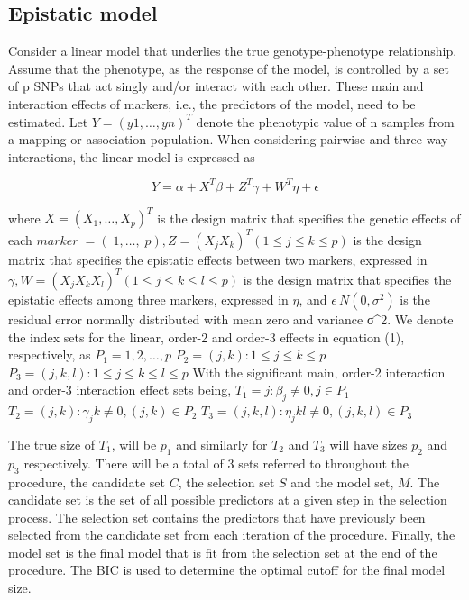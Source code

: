 \documentclass[11pt,]{book}
\theoremstyle{definition}
\theoremstyle{definition}
\theoremstyle{remark}
\begin{document}
\subsection{Epistatic model}\label{epistatic-model}

Consider a linear model that underlies the true genotype-phenotype
relationship. Assume that the phenotype, as the response of the model,
is controlled by a set of p SNPs that act singly and/or interact with
each other. These main and interaction effects of markers, i.e., the
predictors of the model, need to be estimated. Let \(Y = (y1, …, yn)^T\)
denote the phenotypic value of n samples from a mapping or association
population. When considering pairwise and three-way interactions, the
linear model is expressed as

\begin{equation}
Y = \alpha + X^T\beta + Z^T\gamma + W^T\eta + \epsilon
\label{eq:lin-mod}
\end{equation}

where \(X=(X_1,…,X_p )^T\) is the design matrix that specifies the
genetic effects of each
\(marker  = (1, …, p) , Z=(X_j X_k )^T (1≤j≤k≤p)\) is the design
matrix that specifies the epistatic effects between two markers,
expressed in \(\gamma, W=(X_j X_k X_l )^T (1 ≤ j ≤ k ≤ l ≤ p)\) is the
design matrix that specifies the epistatic effects among three markers,
expressed in \(η\), and \(\epsilon ~ N(0,\sigma^2 )\) is the residual
error normally distributed with mean zero and variance σ\^{}2. We denote
the index sets for the linear, order-2 and order-3 effects in equation
(1), respectively, as \(P_1={1,2,…,p}\) \(P_2={(j,k):1≤j≤k≤p}\)
\(P_3={(j,k,l):1≤j≤k≤l≤p}\) With the significant main, order-2
interaction and order-3 interaction effect sets being,
\(T_1={j:β_j≠0,j∈P_1 }\) \(T_2={(j,k):γ_jk≠0,(j,k)∈P_2 }\)
\(T_3={(j,k,l):η_jkl≠0,(j,k,l)∈P_3 }\)

The true size of \(T_1\), will be \(p_1\) and similarly for \(T_2\) and
\(T_3\) will have sizes \(p_2\) and \(p_3\) respectively. There will be
a total of 3 sets referred to throughout the procedure, the candidate
set \(C\), the selection set \(S\) and the model set, \(M\). The
candidate set is the set of all possible predictors at a given step in
the selection process. The selection set contains the predictors that
have previously been selected from the candidate set from each iteration
of the procedure. Finally, the model set is the final model that is fit
from the selection set at the end of the procedure. The BIC is used to
determine the optimal cutoff for the final model size.
\end{document}
